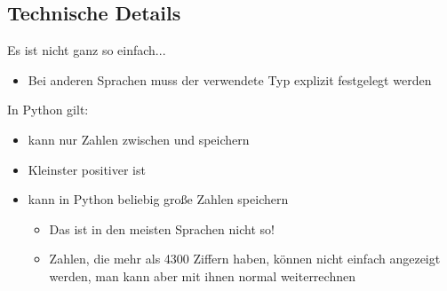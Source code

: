 \subsection{Technische Details}
\begin{frame} %
    \slidehead
    Es ist nicht ganz so einfach...

    \begin{itemize}
        \item Bei anderen Sprachen muss der verwendete Typ explizit festgelegt werden %
    \end{itemize}

    \pause
    In Python gilt:
    \begin{itemize}
        \item {} kann nur Zahlen zwischen  und  speichern
        \item Kleinster positiver  ist 
            \pause
        \item {} kann in Python beliebig große Zahlen speichern
            \begin{itemize}
                \item Das ist in den meisten Sprachen nicht so!
                    \pause
                \item Zahlen, die mehr als 4300 Ziffern haben, können nicht einfach angezeigt werden, man kann aber mit ihnen normal weiterrechnen
            \end{itemize}

    \end{itemize}
\end{frame}





